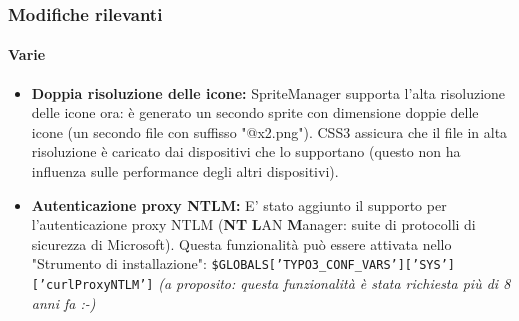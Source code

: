 \begin{frame}[fragile]
	\frametitle{Modifiche rilevanti}
	\framesubtitle{Varie}

	\begin{itemize}

		\item \textbf{Doppia risoluzione delle icone:}\newline
			\small
				SpriteManager supporta l'alta risoluzione delle icone ora: è generato un secondo sprite con dimensione doppie delle icone (un secondo file con suffisso "@x2.png"). CSS3 assicura che il file in alta risoluzione è caricato dai dispositivi che lo supportano\newline
				(questo non ha influenza sulle performance degli altri dispositivi).
			\normalsize

		\item \textbf{Autenticazione proxy NTLM:}\newline
			\small
				E' stato aggiunto il supporto per l'autenticazione proxy NTLM (\textbf{NT} \textbf{L}AN \textbf{M}anager: suite di protocolli di sicurezza di Microsoft). Questa funzionalità può essere attivata nello "Strumento di installazione":\newline
			\normalsize
			\smaller
				\texttt{\$GLOBALS['TYPO3\_CONF\_VARS']['SYS']['curlProxyNTLM']}\newline
				\emph{(a proposito: questa funzionalità è stata richiesta più di 8 anni fa :-)}
			\normalsize

	\end{itemize}
	
\end{frame}


